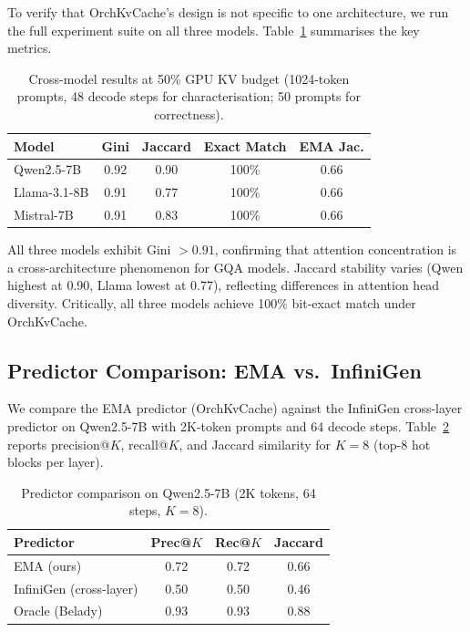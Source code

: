 \documentclass[acmsmall,nonacm,screen]{acmart}
\newcommand{\sys}{OrchKvCache}
\begin{document}
To verify that \sys{}'s design is not specific to one architecture, we run
the full experiment suite on all three models.
Table~\ref{tab:crossmodel} summarises the key metrics.

\begin{table}[t]
\centering
\caption{Cross-model results at 50\% GPU KV budget
  (1024-token prompts, 48 decode steps for characterisation;
  50 prompts for correctness).}
\label{tab:crossmodel}
\begin{tabular}{lcccc}
\toprule
\textbf{Model} & \textbf{Gini} & \textbf{Jaccard} & \textbf{Exact Match} & \textbf{EMA Jac.} \\
\midrule
Qwen2.5-7B   & 0.92 & 0.90 & 100\% & 0.66 \\
Llama-3.1-8B & 0.91 & 0.77 & 100\% & 0.66 \\
Mistral-7B   & 0.91 & 0.83 & 100\% & 0.66 \\
\bottomrule
\end{tabular}
\end{table}

All three models exhibit Gini $> 0.91$, confirming that attention
concentration is a cross-architecture phenomenon for GQA models.  Jaccard
stability varies (Qwen highest at 0.90, Llama lowest at 0.77), reflecting
differences in attention head diversity.  Critically, all three models
achieve 100\% bit-exact match under \sys{}.

\subsection{Predictor Comparison: EMA vs.\ InfiniGen}\label{sec:eval:predictor}

We compare the EMA predictor (\sys{}) against the InfiniGen cross-layer
predictor on Qwen2.5-7B with 2K-token prompts and 64 decode steps.
Table~\ref{tab:predictor} reports precision@$K$, recall@$K$, and Jaccard
similarity for $K{=}8$ (top-8 hot blocks per layer).

\begin{table}[t]
\centering
\caption{Predictor comparison on Qwen2.5-7B (2K tokens, 64 steps, $K{=}8$).}
\label{tab:predictor}
\begin{tabular}{lccc}
\toprule
\textbf{Predictor} & \textbf{Prec@$K$} & \textbf{Rec@$K$} & \textbf{Jaccard} \\
\midrule
EMA (ours)               & 0.72 & 0.72 & 0.66 \\
InfiniGen (cross-layer)  & 0.50 & 0.50 & 0.46 \\
Oracle (Belady)          & 0.93 & 0.93 & 0.88 \\
\bottomrule
\end{tabular}
\end{table}
\end{document}
